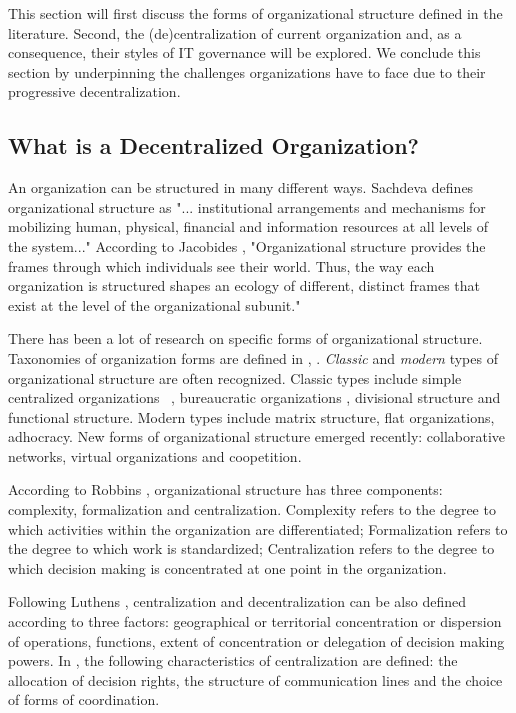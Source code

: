 This section will first discuss the forms of organizational structure defined in the literature. Second, the (de)centralization of current organization and, as a consequence, their styles of IT governance will be explored. We conclude this section by underpinning the challenges organizations have to face due to their progressive decentralization.

\subsection{What is a Decentralized Organization?} 
 
An organization can be structured in many different ways. Sachdeva \cite{sachdeva1990} defines organizational structure as "... institutional arrangements and mechanisms for mobilizing human, physical, financial and information resources at all levels of the system..." According to Jacobides \cite{jacobides2007}, "Organizational structure provides the frames through which individuals see their world. Thus, the way each organization is structured shapes an ecology of different, distinct frames that exist at the level of the organizational subunit." 

There has been a lot of research on specific forms of organizational structure. Taxonomies of organization forms are defined in  \cite{mckelvey1982}, \cite{rich1992}.   \textit{Classic} and \textit{modern} types of organizational structure are often recognized.  Classic types include simple centralized organizations ~\cite{Mintzberg1979}, bureaucratic organizations \cite{mintzberg1981}, divisional structure and functional structure. Modern  types include matrix structure, flat organizations, adhocracy. New forms of organizational structure emerged recently: collaborative networks, virtual organizations and coopetition.

According to Robbins \cite{robbins1997}, organizational structure has three components: complexity, formalization and centralization.  Complexity refers to the degree to which activities within the organization are differentiated; Formalization refers to the degree to which work is standardized; Centralization refers to the degree to which decision making is concentrated at one point in the organization. 

Following Luthens \cite{luthans2006}, centralization and decentralization can be also defined according to three factors:  geographical or territorial concentration or dispersion of operations, functions,  extent of concentration or delegation of decision making powers. In \cite{pearlson2009},  the following characteristics of centralization are defined: the allocation of decision rights,  the structure of communication lines and  the choice of forms of coordination.

